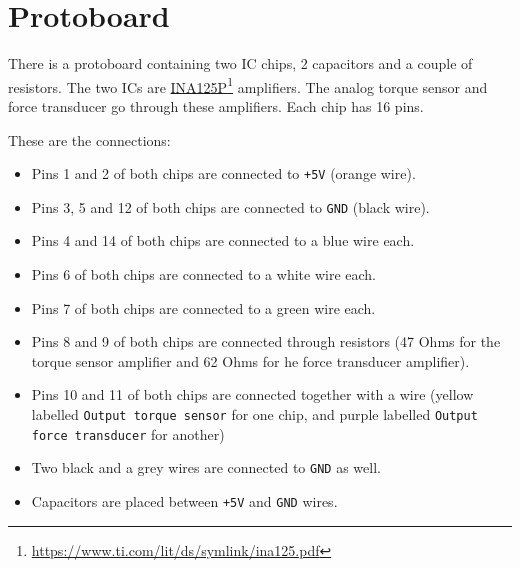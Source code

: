 \section{Protoboard}
There is a protoboard containing two IC chips, 2 capacitors and a couple of resistors. The two ICs are \href{https://www.ti.com/lit/ds/symlink/ina125.pdf}{INA125P}\footnote{\href{https://www.ti.com/lit/ds/symlink/ina125.pdf}{https://www.ti.com/lit/ds/symlink/ina125.pdf}} amplifiers. The analog torque sensor and force transducer go through these amplifiers. Each chip has 16 pins.

These are the connections:
\begin{itemize}[noitemsep]
  \item Pins 1 and 2 of both chips are connected to \verb|+5V| (orange wire).
  \item Pins 3, 5 and 12 of both chips are connected to \verb|GND| (black wire).
  \item Pins 4 and 14 of both chips are connected to a blue wire each.
  \item Pins 6 of both chips are connected to a white wire each.
  \item Pins 7 of both chips are connected to a green wire each.
  \item Pins 8 and 9 of both chips are connected through resistors (47 Ohms for the torque sensor amplifier and 62 Ohms for he force transducer amplifier).
  \item Pins 10 and 11 of both chips are connected together with a wire (yellow labelled \verb|Output torque sensor| for one chip, and purple labelled \verb|Output force transducer| for another)
  \item Two black and a grey wires are connected to \verb|GND| as well.
  \item Capacitors are placed between \verb|+5V| and \verb|GND| wires.
\end{itemize}

